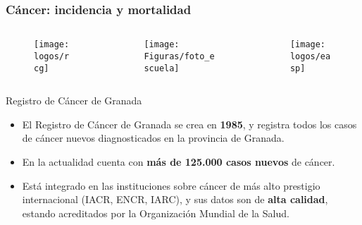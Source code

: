 \documentclass{beamer}
\begin{document}
\begin{frame}\frametitle{Cáncer: incidencia y mortalidad}

	\vspace{-10pt}
	
	\begin{columns}
		\begin{column}{0.33\textwidth}
			\begin{figure}
				\centering
				\texttt{[image: logos/rcg]}
			\end{figure}
		\end{column}
		\begin{column}{0.33\textwidth}
		\begin{figure}
			\centering
			\texttt{[image: Figuras/foto\_escuela]}
		\end{figure}
	\end{column}

		\begin{column}{0.33\textwidth}
			\begin{figure}
				\centering
				\texttt{[image: logos/easp]}
			\end{figure}
		\end{column}
	\end{columns}

	\vspace{0pt}

	\begin{block}{Registro de Cáncer de Granada}
		\begin{itemize}
			\item El Registro de Cáncer de Granada se crea en \textbf{1985}, y registra todos los casos de cáncer nuevos diagnosticados en la provincia de Granada. \\[2ex]
			\item En la actualidad cuenta con \textbf{más de 125.000 casos nuevos} de cáncer. \\[2ex] 
			\item Está integrado en las instituciones sobre cáncer de más alto prestigio internacional (IACR, ENCR, IARC), y sus datos son de \textbf{alta calidad}, estando acreditados por la Organización Mundial de la Salud. \\[2ex] 
		\end{itemize}
	\end{block}

\end{frame}
\end{document}
